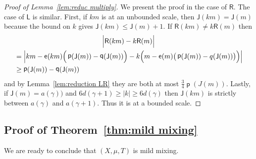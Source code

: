 \documentclass[AHL,Unicode,longabstracts,published]{cedram}
\DeclareMathOperator{\lst}{\mathsf{e}}
\DeclareMathOperator{\p}{\mathsf{p}}
\DeclareMathOperator{\q}{\mathsf{q}}
\newcommand{\lft}{\mathsf{L}}
\newcommand{\rht}{\mathsf{R}}
\newcommand{\scl}{\mathsf{J}}
\let\originalleft\left
\let\originalright\right
\renewcommand{\left}{\mathopen{}\mathclose\bgroup\originalleft}
\renewcommand{\right}{\aftergroup\egroup\originalright}
\begin{document}
\begin{proof}[Proof of Lemma~\ref{lem:reduc multiply}]
We present the proof in the case of $\rht$. The case of $\lft$ is similar. First, if $km$ is at an unbounded scale, then $\scl(km) = \scl(m)$ because the bound on $k$ gives $\scl(km) \le \scl(m) + 1$. If $\rht(km) \neq k\rht(m)$ then
\begin{multline*}
\Big\vert\rht(km)-k\rht(m)\Big\vert \\
\begin{aligned}
&= \left\vert km- \lst(km) \Big(\p (\scl (m))-\q(\scl(m))\Big)-k\Big(m - \lst(m) \big(\p(\scl(m))-q(\scl(m))\big)\Big) \right\vert \\
&\ge \p(\scl(m))-\q(\scl(m))
\end{aligned}
\end{multline*}
and by Lemma~\ref{lem:reduction LR} they are both at most $\frac 3 4
\p(J(m))$. Lastly, if $\scl(m)=a(\gamma))$ and $6d(\gamma+1)\geq|k|\geq 6d(\gamma)$ then $\scl(km)$ is strictly between $a(\gamma)$ and $a(\gamma+1)$. Thus it is at a bounded scale.
\end{proof}



\subsection{Proof of Theorem~\ref{thm:mild mixing}}\label{subsec:mild mixing}

We are ready to conclude that $(X,\mu,T)$ is mild mixing.
\end{document}
